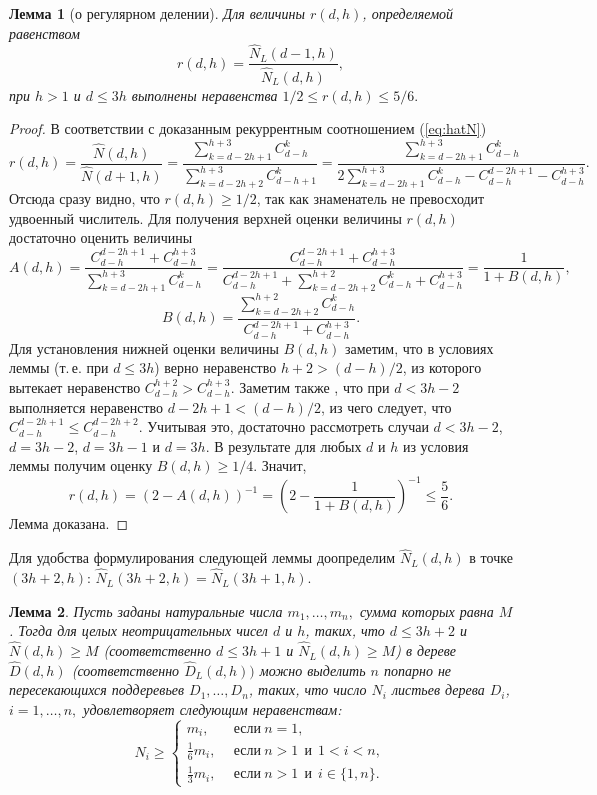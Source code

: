 \documentclass[12pt, a4paper]{article}
\theoremstyle{plain}
\newtheorem{lemma}{Лемма}
\theoremstyle{definition}
\theoremstyle{definition}
\newcommand{\Sum}{\displaystyle\sum\limits}
\renewcommand{\le}{\leqslant}
\renewcommand{\ge}{\geqslant}
\renewcommand{\hat}{\widehat}
\newcommand{\N}{\hat{N}}
\begin{document}
\begin{lemma}[о регулярном делении]
\label{lemma:reg}
Для величины $r(d,h)$\textup{,} определяемой равенством
\[
r(d,h) = \frac{\hat{N}_L(d-1,h)}{\hat{N}_L(d,h)},
\]
при $h > 1$ и $d \le 3h$ выполнены неравенства
$
	1/2 \le r(d,h)  \le 5/6.
$
\end{lemma}

\begin{proof}
В соответствии с доказанным рекуррентным соотношением (\ref{eq:hatN})
\[
r(d,h) = \frac{\hat{N}(d,h)}{\hat{N}(d+1,h)} = \frac{\Sum_{k=d-2h+1}^{h+3}C_{d-h}^k}{\Sum_{k=d-2h+2}^{h+3}C_{d-h + 1}^k} = \frac{\Sum_{k=d-2h+1}^{h+3}C_{d-h}^k}{2\Sum_{k=d-2h+1}^{h+3}C_{d-h}^k - C_{d-h}^{d-2h+1} - C_{d-h}^{h+3}}.
\]
%
Отсюда сразу видно, что $r(d,h) \ge 1/2$, так как знаменатель не превосходит удвоенный числитель. 
Для получения верхней оценки величины $r(d,h)$ достаточно оценить величины
\[
	A(d,h) = \frac{ C_{d-h}^{d-2h+1} + C_{d-h}^{h+3} }{\Sum_{k=d-2h+1}^{h+3}C_{d-h}^k} = \frac{ C_{d-h}^{d-2h+1} + C_{d-h}^{h+3} }{C_{d-h}^{d-2h+1} + \Sum_{k=d-2h+2}^{h+2}C_{d-h}^k + C_{d-h}^{h+3}} = 
	\frac{1}{1 + B(d,h)},
\]
\[
B(d,h) = \frac{\Sum_{k=d-2h+2}^{h+2}C_{d-h}^k }{C_{d-h}^{d-2h+1} + C_{d-h}^{h+3}}.
\]
Для установления нижней оценки величины $B(d,h)$ заметим, что в условиях леммы (т.\,е. при $d \le 3h$)
верно неравенство $h+2>(d-h)/2$, из которого вытекает неравенство $C_{d-h}^{h+2} > C_{d-h}^{h+3}$.  Заметим также , что при $d < 3h-2$ выполняется неравенство $d-2h+1 < (d-h)/2$, из чего следует, что $ C_{d-h}^{d-2h+1} \le C_{d-h}^{d-2h+2}$. 
Учитывая это, достаточно рассмотреть случаи $d < 3h - 2$, $d= 3h-2$, $d= 3h-1$ и $d= 3h$. В результате для любых $d$ и $h$ из условия леммы получим оценку $B(d,h) \ge 1/4$. Значит,
\[
	r(d,h) = (2 - A(d,h))^{-1} = (2 - \frac{1}{1 + B(d,h)})^{-1} \le \frac{5}{6}. 
\]
Лемма доказана.
\end{proof}
 

Для удобства формулирования следующей леммы доопределим $\N_L(d,h)$ 
в точке $(3h+2,h)$: $\N_L(3h+2,h) = \N_L(3h+1,h)$. 
 
\begin{lemma}
\label{lm:key}
Пусть заданы натуральные числа $m_1, \dots, m_n,$ сумма которых равна $M$. 
Тогда для целых неотрицательных чисел $d$ и $h$\textup{,} таких\textup{,} что $d \le 3h + 2$ и $\N(d,h) \ge M$ \textup{(}соответственно $d \le 3h + 1$ и $\N_L(d,h) \ge M$\textup{)} 
в дереве $\hat{D}(d,h)$ \textup{(}соответственно $\hat{D}_L(d,h))$ можно выделить $n$ попарно не пересекающихся поддеревьев $D_1, \dots, D_n$\textup{,} таких\textup{,} что 
число $N_i$ листьев дерева $D_i$, $i=1,\dots,n,$
удовлетворяет следующим неравенствам\textup{:}
\begin{equation}
\label{eq:conditions}
N_i \ge \begin{cases} 
										m_i,&~~\text{если}~n=1,\\
									   \frac{1}{6} m_i,& ~~\text{если}~n>1 ~~\text{и}~~1 < i < n,\\
                                       \frac{1}{3}   m_i,& ~~\text{если}~n>1 ~~\text{и}~~i \in \{1,n\}.
                         \end{cases}
\end{equation}
\end{lemma} 
\end{document}

